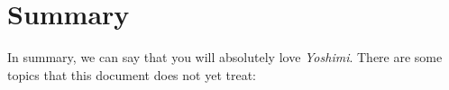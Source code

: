 \documentclass[
 11pt,
 twoside,
 a4paper,
 final                                 %
]{article}
\begin{document}






















































\section{Summary}
\label{sec:summary}

   In summary, we can say that you will absolutely love \textsl{Yoshimi}.
   There are some topics that this document does not yet treat:
\end{document}
